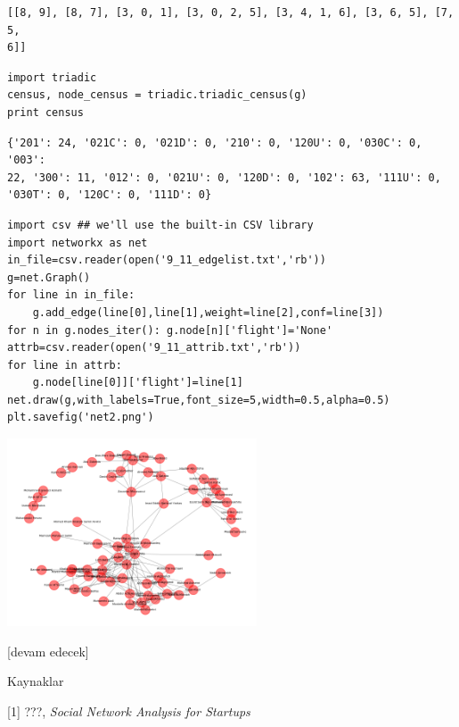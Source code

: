 \documentclass[12pt,fleqn]{article}\usepackage{../../common}
\begin{document}
\begin{verbatim}
[[8, 9], [8, 7], [3, 0, 1], [3, 0, 2, 5], [3, 4, 1, 6], [3, 6, 5], [7, 5,
6]] 
\end{verbatim}


\begin{verbatim}
import triadic
census, node_census = triadic.triadic_census(g)
print census
\end{verbatim}

\begin{verbatim}
{'201': 24, '021C': 0, '021D': 0, '210': 0, '120U': 0, '030C': 0, '003':
22, '300': 11, '012': 0, '021U': 0, '120D': 0, '102': 63, '111U': 0,
'030T': 0, '120C': 0, '111D': 0} 
\end{verbatim}


\begin{verbatim}
import csv ## we'll use the built-in CSV library
import networkx as net
in_file=csv.reader(open('9_11_edgelist.txt','rb'))
g=net.Graph()
for line in in_file:
    g.add_edge(line[0],line[1],weight=line[2],conf=line[3])
for n in g.nodes_iter(): g.node[n]['flight']='None'
attrb=csv.reader(open('9_11_attrib.txt','rb'))
for line in attrb:
    g.node[line[0]]['flight']=line[1]
net.draw(g,with_labels=True,font_size=5,width=0.5,alpha=0.5)
plt.savefig('net2.png')
\end{verbatim}

\includegraphics[width=20em]{net2.png}






[devam edecek]

Kaynaklar

[1] ???, {\em Social Network Analysis for Startups}
\end{document}
